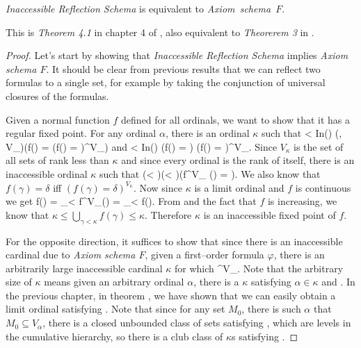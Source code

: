 \begin{theorem}
\emph{Inaccessible Reflection Schema} is equivalent to \emph{Axiom~schema~$F$}.
\end{theorem}

This is \emph{Theorem 4.1} in chapter 4 of \cite{DrakeBook}, also equivalent to \emph{Theorerem 3} in \cite{Levy60a}.

\begin{proof} 
Let's start by showing that \emph{Inaccessible Reflection Schema} implies \emph{Axiom schema $F$}. 
It should be clear from previous results that we can reflect two formulas to a single set, for example by taking the conjunction of universal closures of the formulas.

Given a normal function $f$ defined for all ordinals, we want to show that it has a regular fixed point. 
For any ordinal $\alpha$, there is an ordinal $\kappa$ such that 
\beq
\alpha < \kappa \et In(\kappa) \et (\forall \gamma, \delta \in V_\kappa)(f(\gamma) = \delta \iff (f(\gamma) = \delta)^{V_\kappa})
\eeq
and
\beq
\alpha < \kappa \et In(\kappa) \et \forall \gamma \exists \delta (f(\gamma) = \delta) \iff (\forall \gamma \exists \delta f(\gamma) = \delta)^{V_\kappa}\mbox{.}
\eeq
Since $V_\kappa$ is the set of all sets of rank less than $\kappa$ and since every ordinal is the rank of itself, there is an inaccessible ordinal $\kappa$ such that
\beq
(\forall \gamma < \kappa)(\exists \delta < \kappa)(f^{V_\kappa} (\gamma) = \delta)\label{eq:reflected_function}\mbox{.}
\eeq
We also know that $f(\gamma) = \delta$ iff $(f(\gamma) = \delta)^{V_\kappa}$. 
Now since $\kappa$ is a limit ordinal and $f$ is continuous we get
\beq
f(\kappa) = \bigcup_{\gamma < \kappa} f^{V_\kappa}(\gamma) = \bigcup_{\gamma < \kappa} f(\gamma)\mbox{.}
\eeq
From  and the fact that $f$ is increasing, we know that $\kappa \leq \bigcup_{\gamma < \kappa} f(\gamma) \leq \kappa$. Therefore $\kappa$ is an inaccessible fixed point of $f$.

For the opposite direction, it suffices to show that since there is an inaccessible cardinal due to \emph{Axiom schema $F$}, given a first–order formula $\varphi$, there is an arbitrarily large inaccessible cardinal $\kappa$ for which 
\beq
\varphi \iff \varphi^{V_\kappa}\mbox{.}\label{eq:ch3_f_iff_m_1}
\eeq
Note that the arbitrary size of $\kappa$ means given an arbitrary ordinal $\alpha$, there is a $\kappa$ satisfying $\alpha \in \kappa$ and .
In the previous chapter, in theorem , we have shown that we can easily obtain a limit ordinal satisfying . Note that since for any set $M_0$, there is such $\alpha$ that $M_0 \subseteq V_\alpha$, there is a closed unbounded class of sets satisfying , which are levels in the cumulative hierarchy, so there is a club class of $\kappa$s satisfying .


\end{proof}
